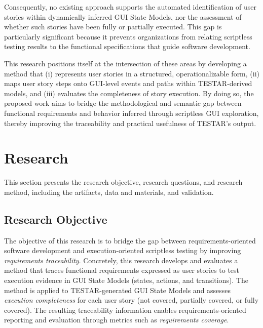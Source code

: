 \documentclass{ou-report-vaf}
\begin{document}
Consequently, no existing approach supports the automated identification of user stories within dynamically inferred GUI State Models, nor the assessment of whether such stories have been fully or partially executed. This gap is particularly significant because it prevents organizations from relating scriptless testing results to the functional specifications that guide software development.

This research positions itself at the intersection of these areas by developing a method that (i) represents user stories in a structured, operationalizable form, (ii) maps user story steps onto GUI-level events and paths within TESTAR-derived models, and (iii) evaluates the completeness of story execution. By doing so, the proposed work aims to bridge the methodological and semantic gap between functional requirements and behavior inferred through scriptless GUI exploration, thereby improving the traceability and practical usefulness of TESTAR's output.

\clearpage
\section{Research}
\label{sec:research}

This section presents the research objective, research questions, and research method, including the artifacts, data and materials, and validation.

\subsection{Research Objective}
\label{subsec:research-objective}

The objective of this research is to bridge the gap between requirements-oriented software development and execution-oriented scriptless testing by improving \emph{requirements traceability}. Concretely, this research develops and evaluates a method that traces functional requirements expressed as user stories to test execution evidence in GUI State Models (states, actions, and transitions). The method is applied to TESTAR-generated GUI State Models and assesses \emph{execution completeness} for each user story (not covered, partially covered, or fully covered). The resulting traceability information enables requirements-oriented reporting and evaluation through metrics such as \emph{requirements coverage}.
\end{document}
